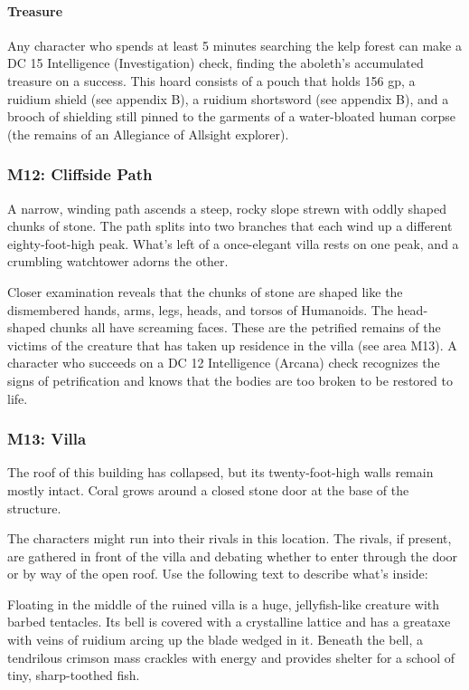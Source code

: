 \documentclass[10pt,a4,twoside,twocolumn,openany,nodeprecatedcode]{dndbook}
\begin{document}
\paragraph{Treasure}
Any character who spends at least 5 minutes searching the kelp forest can make a DC 15 Intelligence (Investigation) check, finding the aboleth's accumulated treasure on a success. This hoard consists of a pouch that holds 156 gp, a ruidium shield (see appendix B), a ruidium shortsword (see appendix B), and a brooch of shielding still pinned to the garments of a water-bloated human corpse (the remains of an Allegiance of Allsight explorer).
\subsubsection{M12: Cliffside Path}
\begin{DndReadAloud}{}
A narrow, winding path ascends a steep, rocky slope strewn with oddly shaped chunks of stone. The path splits into two branches that each wind up a different eighty-foot-high peak. What's left of a once-elegant villa rests on one peak, and a crumbling watchtower adorns the other.
\end{DndReadAloud}

Closer examination reveals that the chunks of stone are shaped like the dismembered hands, arms, legs, heads, and torsos of Humanoids. The head-shaped chunks all have screaming faces. These are the petrified remains of the victims of the creature that has taken up residence in the villa (see area M13). A character who succeeds on a DC 12 Intelligence (Arcana) check recognizes the signs of petrification and knows that the bodies are too broken to be restored to life.
\subsubsection{M13: Villa}
\begin{DndReadAloud}{}
The roof of this building has collapsed, but its twenty-foot-high walls remain mostly intact. Coral grows around a closed stone door at the base of the structure.
\end{DndReadAloud}

The characters might run into their rivals in this location. The rivals, if present, are gathered in front of the villa and debating whether to enter through the door or by way of the open roof. Use the following text to describe what's inside:
\begin{DndReadAloud}{}
Floating in the middle of the ruined villa is a huge, jellyfish-like creature with barbed tentacles. Its bell is covered with a crystalline lattice and has a greataxe with veins of ruidium arcing up the blade wedged in it. Beneath the bell, a tendrilous crimson mass crackles with energy and provides shelter for a school of tiny, sharp-toothed fish.
\end{DndReadAloud}
\end{document}
